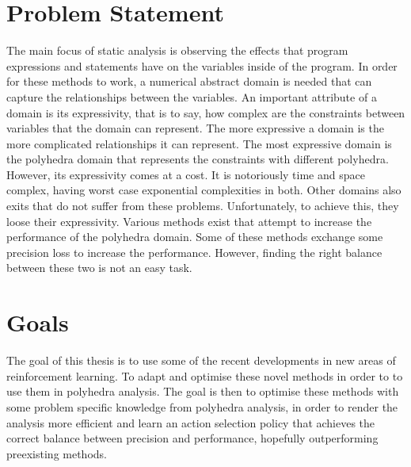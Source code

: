 \section{Problem Statement}
The main focus of static analysis is observing the effects that program expressions and statements have on the variables inside of the program. In order for these methods to work, a numerical abstract domain is needed that can capture the relationships between the variables. An important attribute of a domain is its expressivity, that is to say, how complex are the constraints between variables that the domain can represent. The more expressive a domain is the more complicated relationships it can represent. The most expressive domain is the polyhedra domain that represents the constraints with different polyhedra. However, its expressivity comes at a cost. It is notoriously time and space complex, having worst case exponential complexities in both. Other domains also exits that do not suffer from these problems. Unfortunately, to achieve this, they loose their expressivity. Various methods exist that attempt to increase the performance of the polyhedra domain. Some of these methods exchange some precision loss to increase the performance. However, finding the right balance between these two is not an easy task.

\section{Goals}
The goal of this thesis is to use some of the recent developments in new areas of reinforcement learning. To adapt and optimise these novel methods in order to to use them in polyhedra analysis. The goal is then to optimise these methods with some problem specific knowledge from polyhedra analysis, in order to render the analysis more efficient and learn an action selection policy that achieves the correct balance between precision and performance, hopefully outperforming preexisting methods.

